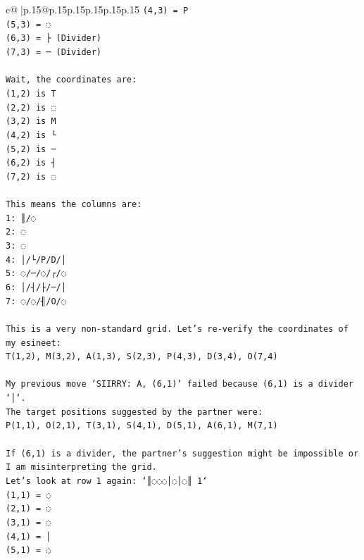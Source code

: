 \documentclass{article}
\begin{document}
{\begin{supertabular}{c@{$\;$}|p{.15\linewidth}@{}p{.15\linewidth}p{.15\linewidth}p{.15\linewidth}p{.15\linewidth}p{.15\linewidth}}
{{{\texttt{(4,3) = P} \\
\texttt{(5,3) = ◌} \\
\texttt{(6,3) = ├ (Divider)} \\
\texttt{(7,3) = ─ (Divider)} \\
\\ 
\texttt{Wait, the coordinates are:} \\
\texttt{(1,2) is T} \\
\texttt{(2,2) is ◌} \\
\texttt{(3,2) is M} \\
\texttt{(4,2) is └} \\
\texttt{(5,2) is ─} \\
\texttt{(6,2) is ┤} \\
\texttt{(7,2) is ◌} \\
\\ 
\texttt{This means the columns are:} \\
\texttt{1: ║/◌} \\
\texttt{2: ◌} \\
\texttt{3: ◌} \\
\texttt{4: │/└/P/D/│} \\
\texttt{5: ◌/─/◌/┌/◌} \\
\texttt{6: │/┤/├/─/│} \\
\texttt{7: ◌/◌/╢/O/◌} \\
\\ 
\texttt{This is a very non{-}standard grid. Let's re{-}verify the coordinates of my esineet:} \\
\texttt{T(1,2), M(3,2), A(1,3), S(2,3), P(4,3), D(3,4), O(7,4)} \\
\\ 
\texttt{My previous move `SIIRRY: A, (6,1)` failed because (6,1) is a divider `│`.} \\
\texttt{The target positions suggested by the partner were:} \\
\texttt{P(1,1), O(2,1), T(3,1), S(4,1), D(5,1), A(6,1), M(7,1)} \\
\\ 
\texttt{If (6,1) is a divider, the partner's suggestion might be impossible or I am misinterpreting the grid.} \\
\texttt{Let's look at row 1 again: `║◌◌◌│◌│◌║ 1`} \\
\texttt{(1,1) = ◌} \\
\texttt{(2,1) = ◌} \\
\texttt{(3,1) = ◌} \\
\texttt{(4,1) = │} \\
\texttt{(5,1) = ◌} \\
}}}
\end{supertabular}}
\end{document}
